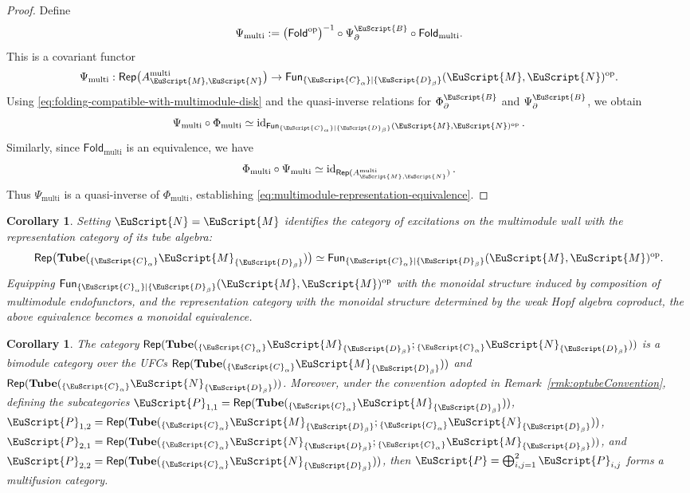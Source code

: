\documentclass[a4paper,11pt]{article}
\newtheorem{corollary}[theorem]{Corollary}
\theoremstyle{definition}
\theoremstyle{remark}
\newcommand\eB           {\EuScript{B}}
\newcommand\eC           {\EuScript{C}}
\newcommand\eD           {\EuScript{D}}
\newcommand\eM          {\EuScript{M}}
\newcommand\eN         {\EuScript{N}}
\newcommand\eP         {\EuScript{P}}
\newcommand{\Rep}{\mathsf{Rep}}
\newcommand{\id}{\operatorname{id}}
\newcommand{\Tube}{\mathbf{Tube}}
\newcommand{\Fun}{\mathsf{Fun}}
\begin{document}
\begin{proof}
    Define
    \begin{equation*}
        \Psi_{\mathrm{multi}}:=\bigl(\mathsf{Fold}^{\mathrm{op}}\bigr)^{-1}\circ \Psi_{\partial}^{\eB}\circ\mathsf{Fold}_{\mathrm{multi}}.
    \end{equation*}
    This is a covariant functor
    \begin{equation*}
        \Psi_{\mathrm{multi}}:\Rep\bigl(A_{\eM,\eN}^{\mathrm{multi}}\bigr)\to\Fun_{\{\eC_\alpha\}|\{\eD_\beta\}} (\eM,\eN)^{\mathrm{op}}.
    \end{equation*}
    Using \eqref{eq:folding-compatible-with-multimodule-disk} and the quasi-inverse relations for $\Phi_{\partial}^{\eB}$ and $\Psi_{\partial}^{\eB}$, we obtain
    \begin{equation*}
        \Psi_{\mathrm{multi}}\circ\Phi_{\mathrm{multi}}
        \simeq\id_{\Fun_{\{\eC_\alpha\}|\{\eD_\beta\}} (\eM,\eN)^{\mathrm{op}}}.
    \end{equation*}
    Similarly, since $\mathsf{Fold}_{\mathrm{multi}}$ is an equivalence, we have
    \begin{equation*}
        \Phi_{\mathrm{multi}}\circ\Psi_{\mathrm{multi}}
        \simeq\id_{\Rep(A_{\eM,\eN}^{\mathrm{multi}})}.
    \end{equation*}
    Thus $\Psi_{\mathrm{multi}}$ is a quasi-inverse of $\Phi_{\mathrm{multi}}$, establishing \eqref{eq:multimodule-representation-equivalence}.
\end{proof}


\begin{corollary}
    \label{cor:multimodule-wall-excitations}
    Setting $\eN=\eM$ identifies the category of excitations on the multimodule wall with the representation category of its tube
    algebra:
    \begin{equation}
        \Rep\bigl(\Tube({}_{\{\eC_\alpha\}}\eM_{\{\eD_\beta\}})\bigr)\simeq
        \Fun_{\{\eC_\alpha\}|\{\eD_\beta\}}(\eM,\eM)^{\rm op}.
    \end{equation}
    Equipping $\Fun_{\{\eC_\alpha\}|\{\eD_\beta\}}(\eM,\eM)^{\rm op}$ with the monoidal structure induced by composition of multimodule endofunctors, and the representation category with the monoidal structure determined by the weak Hopf algebra coproduct, the above equivalence becomes a monoidal equivalence. 
\end{corollary}

\begin{corollary}
The category $\Rep(\Tube({}_{\{\eC_\alpha\}}\eM_{\{\eD_\beta\}};{}_{\{\eC_\alpha\}}\eN_{\{\eD_\beta\}}))$ is a bimodule category over the UFCs $\Rep(\Tube({}_{\{\eC_\alpha\}}\eM_{\{\eD_\beta\}}))$ and $\Rep(\Tube({}_{\{\eC_\alpha\}}\eN_{\{\eD_\beta\}}))$. Moreover, under the convention adopted in Remark~\ref{rmk:optubeConvention},  defining the subcategories
$\eP_{1,1}= \Rep(\Tube({}_{\{\eC_\alpha\}}\eM_{\{\eD_\beta\}}))$,
$\eP_{1,2}= \Rep(\Tube({}_{\{\eC_\alpha\}}\eM_{\{\eD_\beta\}};{}_{\{\eC_\alpha\}}\eN_{\{\eD_\beta\}}))$,
$\eP_{2,1}= \Rep(\Tube({}_{\{\eC_\alpha\}}\eN_{\{\eD_\beta\}};{}_{\{\eC_\alpha\}}\eM_{\{\eD_\beta\}}))$, and
$\eP_{2,2}= \Rep(\Tube({}_{\{\eC_\alpha\}}\eN_{\{\eD_\beta\}}))$,
then  $\eP=\bigoplus_{i,j=1}^{2}\eP_{i,j}$ forms a multifusion category.
\end{corollary}
\end{document}
